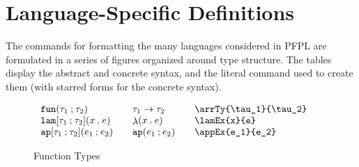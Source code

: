 \documentclass[11pt]{article}
\begin{document}
\section*{Language-Specific Definitions}

The commands for formatting the many languages considered in \textsf{PFPL} are formulated in a series of figures organized around type structure.  The tables display the abstract and concrete syntax, and the literal command used to create them (with starred forms for the concrete syntax).  

\clearpage

\begin{figure}
  \begin{small}
    \begin{displaymath}
      \begin{array}{l@{\qquad}l@{\qquad}l@{\qquad}l}
        \arrTy{\tau_1}{\tau_2} & \arrTy*{\tau_1}{\tau_2} & \verb|\arrTy{\tau_1}{\tau_2}| \\
        \lamEx{x}{e}           & \lamEx*{x}{e}           & \verb|\lamEx{x}{e}|           \\
        \appEx{e_1}{e_2}       & \appEx*{e_1}{e_2}       & \verb|\appEx{e_1}{e_2}|
      \end{array}
    \end{displaymath}
  \end{small}

  \caption{Function Types}
  \label{fig:function}
\end{figure}
\end{document}

